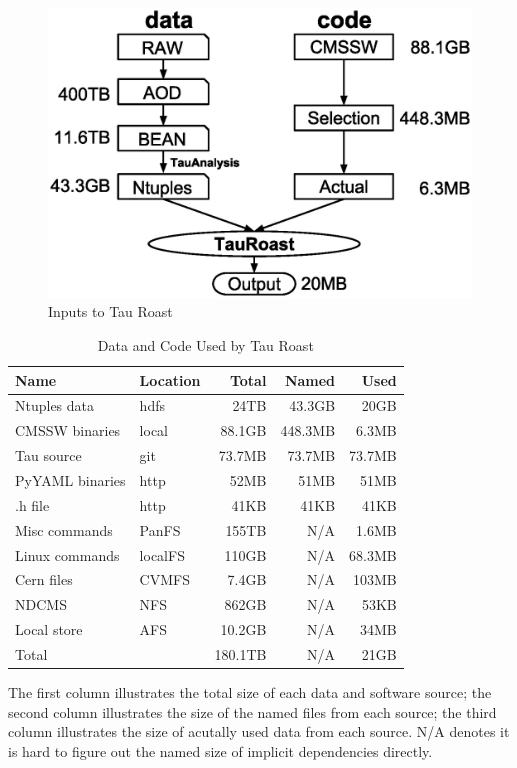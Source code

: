 \documentclass{acm_proc_article-sp}
\begin{document}
\begin{figure}[t]
\centering
\includegraphics[width=.8\columnwidth]{data-code-size.eps}
\caption{Inputs to Tau Roast}
\label{fig:data-code-size}
\end{figure}

\begin{table}[t]
    \centering
    \small
    \begin{tabular}{|l|l|r|r|r|}
        \hline
        \bf Name & \bf Location & \bf Total & \bf Named & \bf Used \\ 
        \hline
        Ntuples data    & hdfs & 24TB & 43.3GB & 20GB \\ \hline
        CMSSW binaries     & local & 88.1GB & 448.3MB & 6.3MB\\ \hline
        Tau source       & git & 73.7MB & 73.7MB & 73.7MB \\ \hline
        PyYAML binaries    & http & 52MB & 51MB & 51MB \\ \hline
        .h file       & http & 41KB & 41KB & 41KB \\ \hline
        Misc commands & PanFS & 155TB & N/A  & 1.6MB \\ \hline
        Linux commands & localFS & 110GB &  N/A & 68.3MB \\ \hline     
        Cern files & CVMFS & 7.4GB & N/A & 103MB \\ \hline
        NDCMS & NFS & 862GB & N/A & 53KB \\ \hline
        Local store & AFS &10.2GB & N/A & 34MB\\ \hline
        Total      &    & 180.1TB            & N/A & 21GB \\ \hline
    \end{tabular}
    \begin{tablenotes}
      \small
      \item The first column illustrates the total size of each data and software source; 
            the second column illustrates the size of the named files from each source;
            the third column illustrates the size of acutally used data from each source.
            N/A denotes it is hard to figure out the named size of implicit dependencies directly.        
    \end{tablenotes}
    \caption{Data and Code Used by Tau Roast}
    \label{table:size-original-real}
\end{table}
\end{document}
